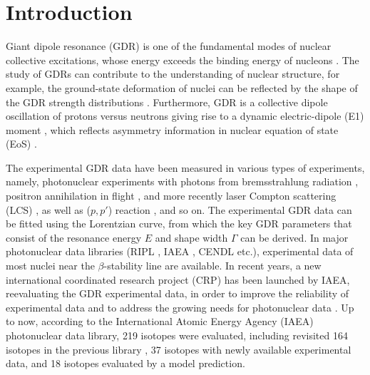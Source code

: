 \documentclass[twocolumn,showpacs,superscriptaddress,amsmath,amssymb,prc,preprintnumbers]{revtex4-1}
\begin{document}
\section{Introduction}

Giant dipole resonance (GDR) is one of the fundamental modes of nuclear collective excitations, whose energy exceeds the binding energy of nucleons \cite{Plujko2018,Kleinig2008}.
The study of GDRs can contribute to the understanding of nuclear structure, for example, the ground-state deformation of nuclei can be reflected by the shape of the GDR strength distributions \cite{Maruhn2005, Myers1977, Goriely2019}.
Furthermore, GDR is a collective dipole oscillation of protons versus neutrons giving rise to a dynamic electric-dipole (E1) moment \cite{Savran2006}, which reflects asymmetry information in nuclear equation of state (EoS) \cite{Bracco2019}.

The experimental GDR data have been measured in various types of experiments, namely, photonuclear experiments \cite{Kawano2020109} with photons from bremsstrahlung radiation \cite{Martinez1995}, positron annihilation in flight \cite{Jones1999}, and more recently laser Compton scattering (LCS) \cite{Tanaka2020,GuoWei2008}, as well as ($p,p'$) reaction \cite{Tamii2011}, and so on.
The experimental GDR data can be fitted using the Lorentzian curve, from which the key GDR parameters that  consist of the resonance energy $E$ and shape width $\Gamma$ can be derived.
In major photonuclear data libraries (RIPL \cite{Capote2009}, IAEA \cite{Kawano2020109}, CENDL \cite{cendl} etc.), experimental data of most nuclei near the $\beta$-stability line are available.
In recent years, a new international coordinated research project (CRP) has been launched by IAEA, reevaluating the GDR experimental data, in order to improve the reliability of experimental data and to address the growing needs for photonuclear data \cite{Plujko2018,Kawano2020109, Goriely2019}.
Up to now, according to the International Atomic Energy Agency (IAEA) photonuclear data library, 219 isotopes were evaluated, including revisited 164 isotopes in the previous library \cite{Plujko2018,Kawano2020109}, 37 isotopes with newly available experimental data, and 18 isotopes evaluated by a model prediction.
\end{document}
